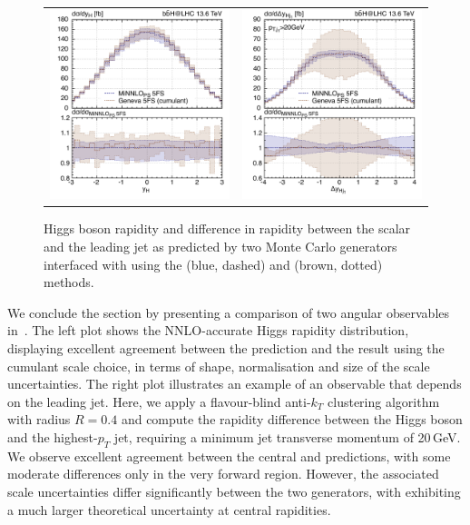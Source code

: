 \documentclass[11pt,a4paper]{article}
\begin{document}
\begin{figure}[t!]
\begin{center}
\begin{tabular}{cc}
\includegraphics[width=.45\textwidth, page=1]{plots/5fs/genevaminnlo/minnloKQvar-geneva-yh.pdf}&
\includegraphics[width=.45\textwidth, page=1]{plots/5fs/genevaminnlo/minnloKQvar-geneva-dyhj.pdf}
\end{tabular}
\vspace*{1ex}
\caption{Higgs boson rapidity and difference in rapidity between the scalar and the leading jet as predicted by two Monte Carlo generators interfaced with  using the \minnlo{} (blue, dashed) and \GENEVA{} (brown, dotted) methods. \label{fig:genevay}}
\end{center}
\end{figure}

We conclude the section by presenting a comparison of two angular observables in~. The left plot shows the NNLO-accurate Higgs rapidity distribution, displaying excellent agreement between the \minnlo{} prediction and the \GENEVA{} result using the cumulant scale choice, in terms of shape, normalisation and size of the scale uncertainties. 
The right plot illustrates an example of an observable that depends on the leading jet. Here, we apply a flavour-blind anti-$k_T$ clustering algorithm with radius $R = 0.4$ and compute the rapidity difference between the Higgs boson and the highest-$p_T$ jet, requiring a minimum jet transverse momentum of 20\,GeV. We observe excellent agreement between the central \minnlo{} and 
\GENEVA{} predictions, with some moderate differences only in the very forward region. However, the associated scale uncertainties differ significantly between the two generators, with \GENEVA{} exhibiting a much larger theoretical uncertainty at central
rapidities.
\end{document}
